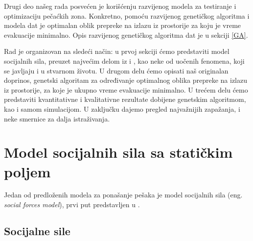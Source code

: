 \documentclass[12pt]{article}
\begin{document}
Drugi deo našeg rada posvećen je korišćenju razvijenog modela za testiranje i optimizaciju pečaćkih zona. Konkretno, pomoću razvijenog genetičkog algoritma i modela dat je optimalan oblik prepreke na izlazu iz prostorije za koju je vreme evakuacije minimalno. Opis razvijenog genetičkog algoritma dat je u sekciji \ref{GA}. 

Rad je organizovan na sledeći način: u prvoj sekciji ćemo predstaviti model socijalnih sila, preuzet najvećim delom iz \citep{Helbing1998} i \citep{Helbing2002}, kao neke od uočenih fenomena, koji se javljaju i u stvarnom životu. U drugom delu ćemo opisati naš originalan doprinos, genetski algoritam za određivanje optimalnog oblika prepreke na izlazu iz prostorije, za koje je ukupno vreme evakuacije minimalno. U trećem delu ćemo predstaviti kvantitativne i kvalitativne rezultate dobijene genetskim algoritmom, kao i samom simulacijom. U zaključku dajemo pregled najvažnijih zapažanja, i neke smernice za dalja istraživanja.

\section{Model socijalnih sila sa statičkim poljem}
\label{sile}

Jedan od predloženih modela za ponašanje pešaka je model socijalnih sila (eng. \emph{social forces model}), prvi put predstavljen u \citep{Helbing1994}.

    \subsection{Socijalne sile}
\end{document}
